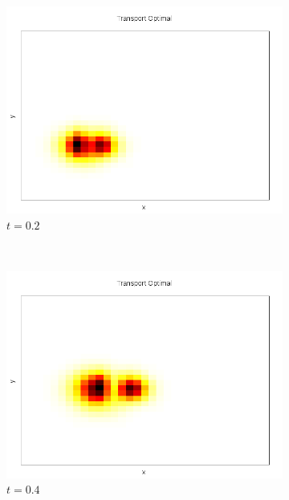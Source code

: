 \documentclass[a4paper,12pt]{article}
\begin{document}
\begin{figure}[!h]
	\begin{subfigure}[b]{0.22\linewidth}
	\includegraphics[width=\textwidth]{img/2DMixture/C_00007.png}
	\caption{$t=0.2$}
	\end{subfigure}
	~
	\begin{subfigure}[b]{0.22\linewidth}
	\includegraphics[width=\textwidth]{img/2DMixture/C_00014.png}
	\caption{$t=0.4$}
	\end{subfigure}
	~
	\begin{subfigure}[b]{0.22\linewidth}

\end{subfigure}
\end{figure}
\end{document}
